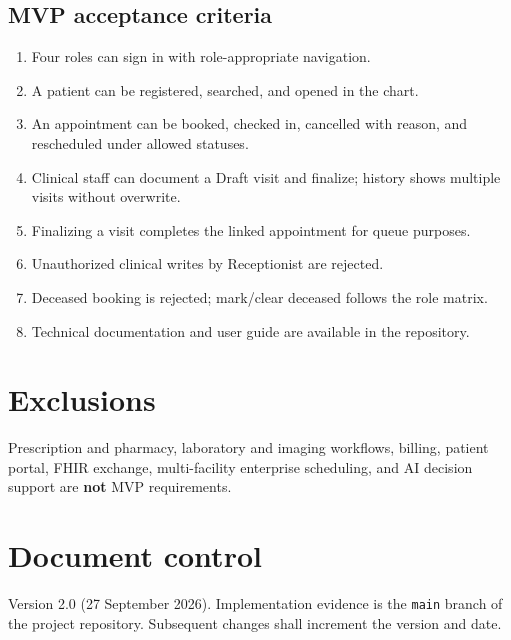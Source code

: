 \documentclass[11pt,a4paper]{article}
\begin{document}
\subsection{MVP acceptance criteria}
\begin{enumerate}
  \item Four roles can sign in with role-appropriate navigation.
  \item A patient can be registered, searched, and opened in the chart.
  \item An appointment can be booked, checked in, cancelled with reason, and rescheduled under allowed statuses.
  \item Clinical staff can document a Draft visit and finalize; history shows multiple visits without overwrite.
  \item Finalizing a visit completes the linked appointment for queue purposes.
  \item Unauthorized clinical writes by Receptionist are rejected.
  \item Deceased booking is rejected; mark/clear deceased follows the role matrix.
  \item Technical documentation and user guide are available in the repository.
\end{enumerate}

\section{Exclusions}
Prescription and pharmacy, laboratory and imaging workflows, billing, patient portal, FHIR exchange, multi-facility enterprise scheduling, and AI decision support are \textbf{not} MVP requirements.

\section*{Document control}
Version 2.0 (27 September 2026). Implementation evidence is the \texttt{main} branch of the project repository. Subsequent changes shall increment the version and date.
\end{document}
